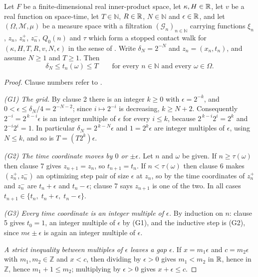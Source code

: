 \begin{helper}
Let $F$ be a finite-dimensional real inner-product space, let $\kappa,H\in\mathbb{R}$,
let $v$ be a real function on space-time, let $T\in\mathbb N$, $R\in\mathbb{R}$,
$N\in\mathbb N$ and $\epsilon\in\mathbb{R}$, and let $(\Omega,\mathcal M,\mu)$ be a
measure space with a filtration $(\mathcal G_n)_{n\in\mathbb N}$ carrying
functions $\xi_n$, $z_n$, $z^+_n$, $z^-_n$, $Q_0(n)$ and $\tau$ which form a
stopped contact walk for $(\kappa,H,T,R,v,N,\epsilon)$ in the sense of
. Write $\delta_N=2^{-N}$ and $z_n=(x_n,t_n)$, and
assume $N\ge1$ and $T\ge1$. Then
\[
  \delta_N\le t_n(\omega)\le T\qquad\text{for every }n\in\mathbb N
  \text{ and every }\omega\in\Omega .
\]
\end{helper}
\begin{proof}
Clause numbers refer to .

\emph{(G1) The grid.} By clause 2 there is an integer $k\ge0$ with
$\epsilon=2^{-k}$, and $0<\epsilon\le\delta_N/4=2^{-N-2}$; since $i\mapsto2^{-i}$
is decreasing, $k\ge N+2$. Consequently $2^{-i}=2^{\,k-i}\epsilon$ is an integer
multiple of $\epsilon$ for every $i\le k$, because $2^{\,k-i}2^{i}=2^{k}$ and
$2^{-i}2^{i}=1$. In particular $\delta_N=2^{\,k-N}\epsilon$ and
$1=2^{k}\epsilon$ are integer multiples of $\epsilon$, using $N\le k$, and so is
$T=(T2^{k})\epsilon$.

\emph{(G2) The time coordinate moves by $0$ or $\pm\epsilon$.} Let $n$ and
$\omega$ be given. If $n\ge\tau(\omega)$ then clause 7 gives $z_{n+1}=z_n$, so
$t_{n+1}=t_n$. If $n<\tau(\omega)$ then clause 6 makes $(z^+_n,z^-_n)$ an
optimizing step pair of size $\epsilon$ at $z_n$, so by  the
time coordinates of $z^+_n$ and $z^-_n$ are $t_n+\epsilon$ and $t_n-\epsilon$;
clause 7 says $z_{n+1}$ is one of the two. In all cases
$t_{n+1}\in\{t_n,\;t_n+\epsilon,\;t_n-\epsilon\}$.

\emph{(G3) Every time coordinate is an integer multiple of $\epsilon$.} By
induction on $n$: clause 5 gives $t_0=1$, an integer multiple of $\epsilon$ by
(G1), and the inductive step is (G2), since $m\epsilon\pm\epsilon$ is again an
integer multiple of $\epsilon$.

\emph{A strict inequality between multiples of $\epsilon$ leaves a gap
$\epsilon$.} If $x=m_1\epsilon$ and $c=m_2\epsilon$ with $m_1,m_2\in\mathbb Z$
and $x<c$, then dividing by $\epsilon>0$ gives $m_1<m_2$ in $\mathbb{R}$, hence in
$\mathbb Z$, hence $m_1+1\le m_2$; multiplying by $\epsilon>0$ gives
$x+\epsilon\le c$.


\end{proof}

